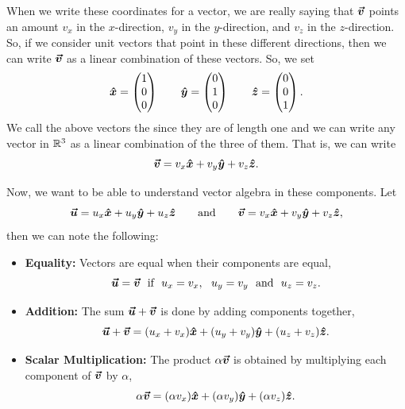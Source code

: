        When we write these coordinates for a vector, we are really saying that $\boldsymbol{\boldsymbol{\vec{v}}}$ points an amount $v_x$ in the $x$-direction, $v_y$ in the $y$-direction, and $v_z$ in the $z$-direction.  So, if we consider unit vectors that point in these different directions, then we can  write $\boldsymbol{\boldsymbol{\vec{v}}}$ as a linear combination of these vectors.  So, we set
        \[
        \boldsymbol{\hat{x}} = \begin{pmatrix} 1 \\ 0 \\ 0 \end{pmatrix} \qquad \boldsymbol{\hat{y}} = \begin{pmatrix} 0 \\ 1 \\ 0 \end{pmatrix} \qquad \boldsymbol{\hat{z}} = \begin{pmatrix} 0 \\ 0 \\ 1 \end{pmatrix}.
        \]
        We call the above vectors the  since they are of  length one and we can write any vector in $\mathbb{R}^3$ as a linear combination of the three of them.  That is, we can write 
        \[
        \boldsymbol{\boldsymbol{\vec{v}}} = v_x \boldsymbol{\hat{x}} + v_y \boldsymbol{\hat{y}} + v_z \boldsymbol{\hat{z}}.
        \]
        

        Now, we want to be able to understand vector algebra in these components. Let 
        \[
        \boldsymbol{\boldsymbol{\vec{u}}} = u_x \boldsymbol{\hat{x}} + u_y \boldsymbol{\hat{y}} + u_z \boldsymbol{\hat{z}} \qquad \textrm{and} \qquad \boldsymbol{\boldsymbol{\vec{v}}} = v_x \boldsymbol{\hat{x}} + v_y \boldsymbol{\hat{y}} + v_z \boldsymbol{\hat{z}},
        \]
        then we can note the following:
        
        \begin{itemize}
            \item \textbf{Equality:} Vectors are equal when their components are equal,
            \[
            \boldsymbol{\boldsymbol{\vec{u}}}=\boldsymbol{\boldsymbol{\vec{v}}} ~~ \textrm{if} ~~ u_x=v_x, ~~ u_y=v_y ~~ \textrm{and} ~~ u_z=v_z.
            \]
            \item \textbf{Addition:} The sum $\boldsymbol{\boldsymbol{\vec{u}}} + \boldsymbol{\boldsymbol{\vec{v}}}$ is done by adding components together,
            \[
            \boldsymbol{\boldsymbol{\vec{u}}}+\boldsymbol{\boldsymbol{\vec{v}}}=(u_x+v_x)\boldsymbol{\hat{x}} + (u_y + v_y)\boldsymbol{\hat{y}} + (u_z + v_z)\boldsymbol{\hat{z}}.
            \]
            \item \textbf{Scalar Multiplication:} The product $\alpha \boldsymbol{\boldsymbol{\vec{v}}}$ is obtained by multiplying each component of $\boldsymbol{\boldsymbol{\vec{v}}}$ by $\alpha$,
            \[
            \alpha \boldsymbol{\boldsymbol{\vec{v}}} = (\alpha v_x) \boldsymbol{\hat{x}} + (\alpha v_y)\boldsymbol{\hat{y}} + (\alpha v_z)\boldsymbol{\hat{z}}.
            \]
        \end{itemize}
        
